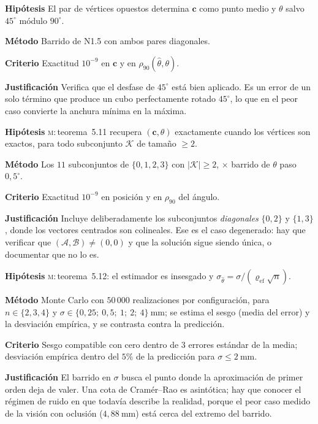 \documentclass[11pt,a4paper]{article}
\newcommand{\cc}{\mathbf{c}}
\newcommand{\grados}{^{\circ}}
\newenvironment{prueba}[2]{%
  \par\medskip\noindent
  \begin{tcolorbox}[enhanced,breakable,colback=white,colframe=black!45,
    boxrule=0.5pt,arc=1pt,left=6pt,right=6pt,top=4pt,bottom=4pt,
    title={\bfseries #1\quad\normalfont #2},
    colbacktitle=black!8,coltitle=black,fonttitle=\bfseries\small]
  \small
}{\end{tcolorbox}\par\medskip}
\newcommand{\campo}[1]{\par\smallskip\noindent\textbf{#1}\quad\ignorespaces}
\begin{document}
\begin{prueba}{N1.8}{Estimador B3 --- diagonal}
\campo{Hipótesis} El par de vértices opuestos determina $\cc$ como punto medio y
$\theta$ salvo $45\grados$ módulo $90\grados$.
\campo{Método} Barrido de N1.5 con ambos pares diagonales.
\campo{Criterio} Exactitud $10^{-9}$ en $\cc$ y en $\rho_{90}(\hat\theta,\theta)$.
\campo{Justificación} Verifica que el desfase de $45\grados$ está bien aplicado. Es un
error de un solo término que produce un cubo perfectamente rotado $45\grados$, lo que
en el peor caso convierte la anchura mínima en la máxima.
\end{prueba}

\begin{prueba}{N1.9}{Estimador B4 --- Procrustes sin ruido}
\campo{Hipótesis} \textsc{m}:\,teorema~5.11 recupera $(\cc,\theta)$ exactamente cuando los
vértices son exactos, para todo subconjunto $\mathcal K$ de tamaño $\ge 2$.
\campo{Método} Los $11$ subconjuntos de $\{0,1,2,3\}$ con $|\mathcal K|\ge2$,
$\times$ barrido de $\theta$ paso $0{,}5\grados$.
\campo{Criterio} Exactitud $10^{-9}$ en posición y en $\rho_{90}$ del ángulo.
\campo{Justificación} Incluye deliberadamente los subconjuntos \emph{diagonales}
$\{0,2\}$ y $\{1,3\}$, donde los vectores centrados son colineales. Ese es el caso
degenerado: hay que verificar que $(\mathcal A,\mathcal B)\ne(0,0)$ y que la solución
sigue siendo única, o documentar que no lo es.
\end{prueba}

\begin{prueba}{N1.10}{Estimador B4 --- insesgadez y eficiencia bajo ruido}
\campo{Hipótesis} \textsc{m}:\,teorema~5.12: el estimador es insesgado y
$\sigma_{\hat\theta} = \sigma/(\varrho_{\mathrm{ef}}\sqrt n)$.
\campo{Método} Monte Carlo con $50\,000$ realizaciones por configuración, para
$n\in\{2,3,4\}$ y $\sigma \in \{0{,}25;\ 0{,}5;\ 1;\ 2;\ 4\}\ \mathrm{mm}$; se estima
el sesgo (media del error) y la desviación empírica, y se contrasta contra la
predicción.
\campo{Criterio} Sesgo compatible con cero dentro de $3$ errores estándar de la media;
desviación empírica dentro del $5\%$ de la predicción para $\sigma \le 2\ \mathrm{mm}$.
\campo{Justificación} El barrido en $\sigma$ busca el punto donde la aproximación de
primer orden deja de valer. Una cota de Cramér--Rao es asintótica; hay que conocer el
régimen de ruido en que todavía describe la realidad, porque el peor caso medido de la
visión con oclusión ($4{,}88\ \mathrm{mm}$) está cerca del extremo del barrido.
\end{prueba}
\end{document}
